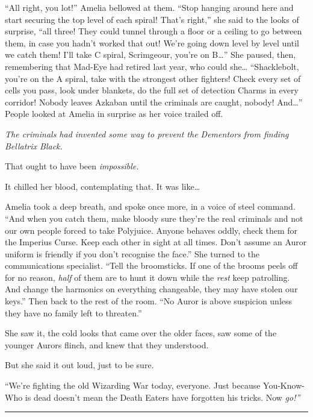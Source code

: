 ``All right, you lot!'' Amelia bellowed at them. ``Stop hanging around
here and start securing the top level of each spiral! That's right,''
she said to the looks of surprise, ``all three! They could tunnel
through a floor or a ceiling to go between them, in case you hadn't
worked that out! We're going down level by level until we catch them!
I'll take C spiral, Scrimgeour, you're on B\ldots{}'' She paused, then,
remembering that Mad-Eye had retired last year, who could she\ldots{}
``Shacklebolt, you're on the A spiral, take with the strongest other
fighters! Check every set of cells you pass, look under blankets, do the
full set of detection Charms in every corridor! Nobody leaves Azkaban
until the criminals are caught, nobody! And\ldots{}'' People looked at
Amelia in surprise as her voice trailed off.

\emph{The criminals had invented some way to prevent the Dementors from
finding Bellatrix Black.}

That ought to have been \emph{impossible.}

It chilled her blood, contemplating that. It was like\ldots{}

Amelia took a deep breath, and spoke once more, in a voice of steel
command. ``And when you catch them, make bloody sure they're the real
criminals and not our own people forced to take Polyjuice. Anyone
behaves oddly, check them for the Imperius Curse. Keep each other in
sight at all times. Don't assume an Auror uniform is friendly if you
don't recognise the face.'' She turned to the communications specialist.
``Tell the broomsticks. If one of the brooms peels off for no reason,
\emph{half} of them are to hunt it down while the \emph{rest} keep
patrolling. And change the harmonics on everything changeable, they may
have stolen our keys.'' Then back to the rest of the room. ``No Auror is
above suspicion unless they have no family left to threaten.''

She saw it, the cold looks that came over the older faces, saw some of
the younger Aurors flinch, and knew that they understood.

But she said it out loud, just to be sure.

``We're fighting the old Wizarding War today, everyone. Just because
You-Know-Who is dead doesn't mean the Death Eaters have forgotten his
tricks. Now \emph{go!''}

\begin{center}\rule{3in}{0.4pt}\end{center}


